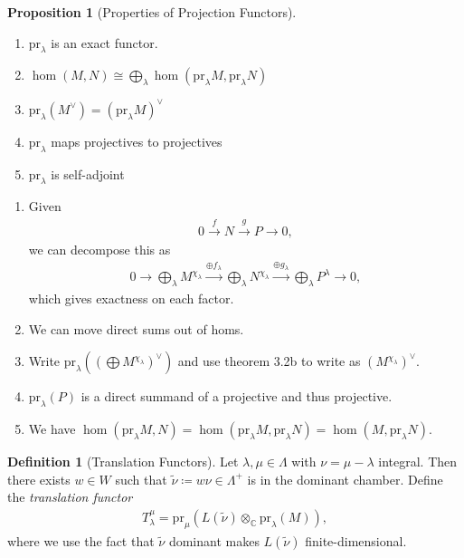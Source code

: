 \documentclass[11pt]{scrartcl}
\theoremstyle{definition}
\theoremstyle{theorem}
\newtheorem{proposition}[theorem]{Proposition}
\theoremstyle{proof}
\newenvironment{proof}
{\pushQED{$\qed$}\pf}
{\par\popQED\endpf}
\theoremstyle{definition}
\newtheorem{definition}{Definition}[theorem]
\theoremstyle{break}
\theoremstyle{problem}
\providecommand{\tightlist}{%
  \setlength{\itemsep}{0pt}\setlength{\parskip}{0pt}}
\DeclarePairedDelimiter\qty{(}{)}
\renewcommand{\qty}[1]{{\left(  {#1} \right)}}
\newcommand{\CC}[0]{{\mathbb{C}}}
\newcommand{\definedas}[0]{\coloneqq}
\newcommand{\dual}[0]{^\vee}
\newcommand{\mapsvia}[1]{\xrightarrow{#1}}
\newcommand{\tensor}[0]{\otimes}
\renewcommand{\qed}[0]{\hfill\blacksquare}
\renewcommand{\to}[0]{\longrightarrow}
\begin{document}
\begin{proposition}[Properties of Projection Functors]

\hfill

\begin{enumerate}
\def\labelenumi{\arabic{enumi}.}
\tightlist
\item
  \(\mathrm{pr}_\lambda\) is an exact functor.
\item
  \(\hom(M, N) \cong \bigoplus_\lambda \hom(\mathrm{pr}_\lambda M, \mathrm{pr}_\lambda N)\)
\item
  \(\mathrm{pr}_\lambda (M\dual) = (\mathrm{pr}_\lambda M)\dual\)
\item
  \(\mathrm{pr}_\lambda\) maps projectives to projectives
\item
  \(\mathrm{pr}_\lambda\) is self-adjoint
\end{enumerate}

\end{proposition}

\begin{proof}

\hfill

\begin{enumerate}
\def\labelenumi{\arabic{enumi}.}
\tightlist
\item
  Given
  \begin{align*}0 \mapsvia f N \mapsvia g P \to 0,\end{align*} we can
  decompose this as
  \begin{align*}0 \to \bigoplus_\lambda M^{\chi_\lambda} \mapsvia{\oplus f_\lambda} \bigoplus_\lambda N^{\chi_\lambda} \mapsvia {\oplus g_\lambda} \bigoplus_\lambda P^\lambda \to 0,\end{align*}
  which gives exactness on each factor.
\item
  We can move direct sums out of homs.
\item
  Write
  \(\mathrm{pr}_\lambda \qty{ \qty{\bigoplus M^{\chi_\lambda} }\dual }\)
  and use theorem 3.2b to write as \((M^{\chi_\lambda})\dual\).
\item
  \(\mathrm{pr}_\lambda(P)\) is a direct summand of a projective and
  thus projective.
\item
  We have
  \(\hom(\mathrm{pr}_\lambda M, N) = \hom(\mathrm{pr}_\lambda M, \mathrm{pr}_\lambda N) = \hom(M, \mathrm{pr}_\lambda N)\).
\end{enumerate}

\end{proof}

\begin{definition}[Translation Functors]

Let \(\lambda, \mu \in \Lambda\) with \(\nu = \mu - \lambda\) integral.
Then there exists \(w\in W\) such that
\(\tilde \nu \definedas w\nu \in \Lambda^+\) is in the dominant chamber.
Define the \emph{translation functor}
\begin{align*}T_\lambda^\mu = \mathrm{pr}_\mu(L(\tilde \nu) \tensor_\CC \mathrm{pr}_\lambda(M)),\end{align*}
where we use the fact that \(\tilde \nu\) dominant makes
\(L(\tilde \nu)\) finite-dimensional.\end{definition}
\end{document}
